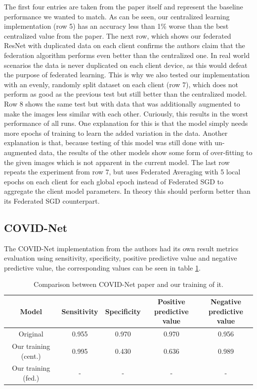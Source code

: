 The first four entries are taken from the paper itself and represent the baseline performance we wanted to match. As can be seen, our centralized learning implementation (row 5) has an accuracy less than 1\% worse than the best centralized value from the paper. 
The next row, which shows our federated ResNet with duplicated data on each client confirms the authors claim that the federation algorithm performs even better than the centralized one.
In real world scenarios the data is never duplicated on each client device, as this would defeat the purpose of federated learning.
This is why we also tested our implementation with an evenly, randomly split dataset on each client (row 7), which does not perform as good as the previous test but still better than the centralized model.
Row 8 shows the same test but with data that was additionally augmented to make the images less similar with each other. Curiously, this results in the worst performance of all runs. One explanation for this is that the model simply needs more epochs of training to learn the added variation in the data. Another explanation is that, because testing of this model was still done with un-augmented data, the results of the other models show some form of over-fitting to the given images which is not apparent in the current model.
The last row repeats the experiment from row 7, but uses Federated Averaging with 5 local epochs on each client for each global epoch instead of Federated SGD to aggregate the client model parameters. In theory this should perform better than its Federated SGD counterpart.

\subsection{COVID-Net}
The COVID-Net implementation from the authors had its own result metrics evaluation using sensitivity, specificity, positive predictive value and negative predictive value, the corresponding values can be seen in table \ref{tab:results_covidnet}. 

\begin{table}[htbp]
    \captionsetup[table]{justification=centering}
    \small
    \centering
    \caption{Comparison between COVID-Net paper\cite{covid_net} and our training of it.}
    \begin{tabular}{c|c|c|c|c}
        Model & Sensitivity & Specificity & \shortstack[c]{Positive\\predictive value}  & \shortstack[c]{Negative\\predictive value}\\
        \hline
        Original & 0.955 & 0.970 & 0.970 & 0.956 \\
        Our training (cent.) & 0.995 & 0.430 & 0.636 & 0.989 \\
        Our training (fed.) & - & - & - & -\\
    \end{tabular}
    \label{tab:results_covidnet}
\end{table}

